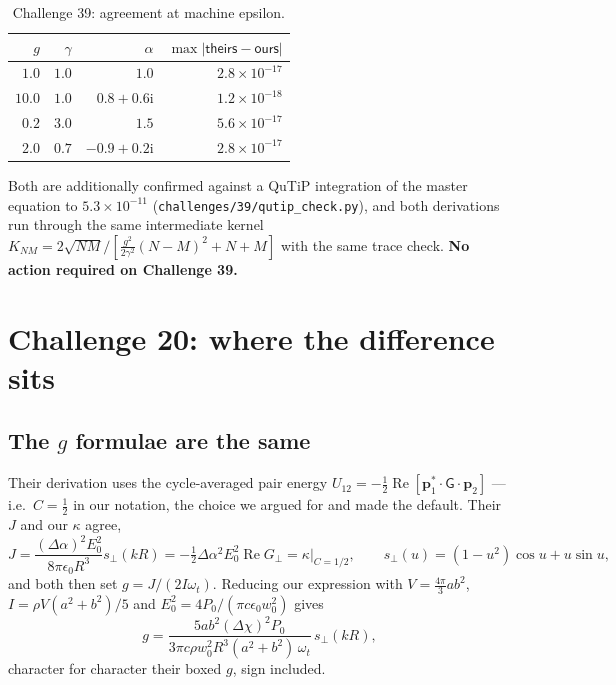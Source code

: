 \documentclass[11pt,a4paper]{article}
\newcommand{\dalpha}{\Delta\alpha}
\newcommand{\dchi}{\Delta\chi}
\newcommand{\ours}{\textsf{ours}}
\newcommand{\theirs}{\textsf{theirs}}
\begin{document}
\begin{table}[h]
\centering\small
\begin{tabular}{rrrr}
\toprule
$g$ & $\gamma$ & $\alpha$ & $\max|\theirs-\ours|$ \\
\midrule
$1.0$ & $1.0$ & $1.0$ & $2.8\times10^{-17}$ \\
$10.0$ & $1.0$ & $0.8+0.6\mathrm{i}$ & $1.2\times10^{-18}$ \\
$0.2$ & $3.0$ & $1.5$ & $5.6\times10^{-17}$ \\
$2.0$ & $0.7$ & $-0.9+0.2\mathrm{i}$ & $2.8\times10^{-17}$ \\
\bottomrule
\end{tabular}
\caption{Challenge 39: agreement at machine epsilon.}
\end{table}

\noindent
Both are additionally confirmed against a QuTiP integration of the master
equation to $5.3\times10^{-11}$ (\texttt{challenges/39/qutip\_check.py}), and
both derivations run through the same intermediate kernel
$K_{NM}=2\sqrt{NM}/[\frac{g^{2}}{2\gamma^{2}}(N-M)^{2}+N+M]$ with the same
trace check.  \textbf{No action required on Challenge 39.}

\section{Challenge 20: where the difference sits}

\subsection{The $g$ formulae are the same}

Their derivation uses the cycle-averaged pair energy
$U_{12}=-\tfrac12\operatorname{Re}[\mathbf p_1^{*}\!\cdot\!\mathsf G\!\cdot\!
\mathbf p_2]$ --- i.e.\ $C=\tfrac12$ in our notation, the choice we argued for
and made the default.  Their $J$ and our $\kappa$ agree,
\begin{equation}
  J=\frac{(\dalpha)^{2}E_0^{2}}{8\pi\epsilon_0R^{3}}s_{\perp}(kR)
  =-\tfrac12\dalpha^{2}E_0^{2}\operatorname{Re}G_{\perp}
  =\kappa\big|_{C=1/2},
  \qquad
  s_{\perp}(u)=(1-u^{2})\cos u+u\sin u,
\end{equation}
and both then set $g=J/(2I\omega_t)$.  Reducing our expression with
$V=\tfrac{4\pi}{3}ab^{2}$, $I=\rho V(a^{2}+b^{2})/5$ and
$E_0^{2}=4P_0/(\pi c\epsilon_0w_0^{2})$ gives
\begin{equation}
  g=\frac{5ab^{2}(\dchi)^{2}P_0}
         {3\pi c\rho w_0^{2}R^{3}(a^{2}+b^{2})\,\omega_t}\,s_{\perp}(kR),
\end{equation}
character for character their boxed $g$, sign included.
\end{document}
